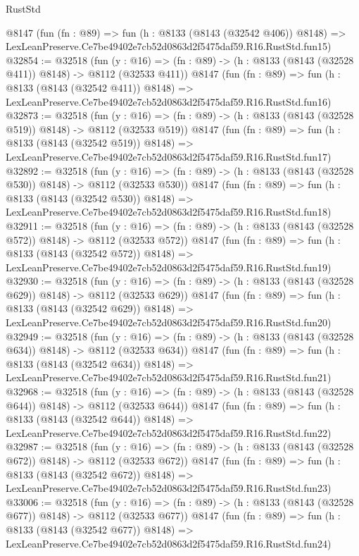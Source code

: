 \begin{lexlean}{RustStd}
\begin{coremodule}
    @8147
    (fun (fn : @89) =>
    fun (h : @8133 (@8143 (@32542 @406)) @8148) =>
    LexLeanPreserve.Ce7be49402e7cb52d0863d2f5475daf59.R16.RustStd.fun15)
@32854 := @32518
    (fun (y : @16) => (fn : @89) -> (h : @8133 (@8143 (@32528 @411)) @8148) -> @8112 (@32533 @411))
    @8147
    (fun (fn : @89) =>
    fun (h : @8133 (@8143 (@32542 @411)) @8148) =>
    LexLeanPreserve.Ce7be49402e7cb52d0863d2f5475daf59.R16.RustStd.fun16)
@32873 := @32518
    (fun (y : @16) => (fn : @89) -> (h : @8133 (@8143 (@32528 @519)) @8148) -> @8112 (@32533 @519))
    @8147
    (fun (fn : @89) =>
    fun (h : @8133 (@8143 (@32542 @519)) @8148) =>
    LexLeanPreserve.Ce7be49402e7cb52d0863d2f5475daf59.R16.RustStd.fun17)
@32892 := @32518
    (fun (y : @16) => (fn : @89) -> (h : @8133 (@8143 (@32528 @530)) @8148) -> @8112 (@32533 @530))
    @8147
    (fun (fn : @89) =>
    fun (h : @8133 (@8143 (@32542 @530)) @8148) =>
    LexLeanPreserve.Ce7be49402e7cb52d0863d2f5475daf59.R16.RustStd.fun18)
@32911 := @32518
    (fun (y : @16) => (fn : @89) -> (h : @8133 (@8143 (@32528 @572)) @8148) -> @8112 (@32533 @572))
    @8147
    (fun (fn : @89) =>
    fun (h : @8133 (@8143 (@32542 @572)) @8148) =>
    LexLeanPreserve.Ce7be49402e7cb52d0863d2f5475daf59.R16.RustStd.fun19)
@32930 := @32518
    (fun (y : @16) => (fn : @89) -> (h : @8133 (@8143 (@32528 @629)) @8148) -> @8112 (@32533 @629))
    @8147
    (fun (fn : @89) =>
    fun (h : @8133 (@8143 (@32542 @629)) @8148) =>
    LexLeanPreserve.Ce7be49402e7cb52d0863d2f5475daf59.R16.RustStd.fun20)
@32949 := @32518
    (fun (y : @16) => (fn : @89) -> (h : @8133 (@8143 (@32528 @634)) @8148) -> @8112 (@32533 @634))
    @8147
    (fun (fn : @89) =>
    fun (h : @8133 (@8143 (@32542 @634)) @8148) =>
    LexLeanPreserve.Ce7be49402e7cb52d0863d2f5475daf59.R16.RustStd.fun21)
@32968 := @32518
    (fun (y : @16) => (fn : @89) -> (h : @8133 (@8143 (@32528 @644)) @8148) -> @8112 (@32533 @644))
    @8147
    (fun (fn : @89) =>
    fun (h : @8133 (@8143 (@32542 @644)) @8148) =>
    LexLeanPreserve.Ce7be49402e7cb52d0863d2f5475daf59.R16.RustStd.fun22)
@32987 := @32518
    (fun (y : @16) => (fn : @89) -> (h : @8133 (@8143 (@32528 @672)) @8148) -> @8112 (@32533 @672))
    @8147
    (fun (fn : @89) =>
    fun (h : @8133 (@8143 (@32542 @672)) @8148) =>
    LexLeanPreserve.Ce7be49402e7cb52d0863d2f5475daf59.R16.RustStd.fun23)
@33006 := @32518
    (fun (y : @16) => (fn : @89) -> (h : @8133 (@8143 (@32528 @677)) @8148) -> @8112 (@32533 @677))
    @8147
    (fun (fn : @89) =>
    fun (h : @8133 (@8143 (@32542 @677)) @8148) =>
    LexLeanPreserve.Ce7be49402e7cb52d0863d2f5475daf59.R16.RustStd.fun24)

\end{coremodule}
\end{lexlean}

